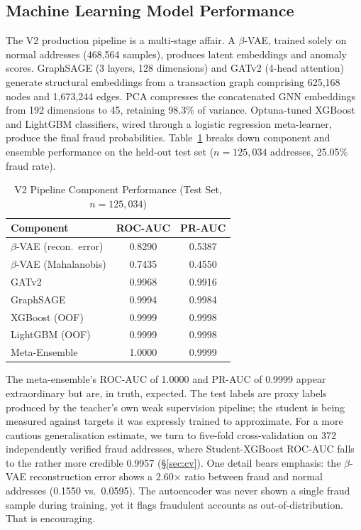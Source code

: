 \documentclass[journal]{IEEEtran}
\begin{document}
\subsection{Machine Learning Model Performance}

The V2 production pipeline is a multi-stage affair. A $\beta$-VAE, trained solely on normal addresses (468,564 samples), produces latent embeddings and anomaly scores. GraphSAGE (3 layers, 128 dimensions) and GATv2 (4-head attention) generate structural embeddings from a transaction graph comprising 625,168 nodes and 1,673,244 edges. PCA compresses the concatenated GNN embeddings from 192 dimensions to 45, retaining 98.3\% of variance. Optuna-tuned XGBoost and LightGBM classifiers, wired through a logistic regression meta-learner, produce the final fraud probabilities. Table~\ref{tab:v2performance} breaks down component and ensemble performance on the held-out test set ($n = 125{,}034$ addresses, 25.05\% fraud rate).

\begin{table}[!t]
\centering
\caption{V2 Pipeline Component Performance (Test Set, $n = 125{,}034$)}
\label{tab:v2performance}
\begin{tabular}{lcc}
\toprule
\textbf{Component} & \textbf{ROC-AUC} & \textbf{PR-AUC} \\
\midrule
$\beta$-VAE (recon.\ error) & 0.8290 & 0.5387 \\
$\beta$-VAE (Mahalanobis)   & 0.7435 & 0.4550 \\
GATv2                       & 0.9968 & 0.9916 \\
GraphSAGE                   & 0.9994 & 0.9984 \\
XGBoost (OOF)               & 0.9999 & 0.9998 \\
LightGBM (OOF)              & 0.9999 & 0.9998 \\
Meta-Ensemble               & 1.0000 & 0.9999 \\
\bottomrule
\end{tabular}
\end{table}

The meta-ensemble's ROC-AUC of 1.0000 and PR-AUC of 0.9999 appear extraordinary but are, in truth, expected. The test labels are proxy labels produced by the teacher's own weak supervision pipeline; the student is being measured against targets it was expressly trained to approximate. For a more cautious generalisation estimate, we turn to five-fold cross-validation on 372 independently verified fraud addresses, where Student-XGBoost ROC-AUC falls to the rather more credible 0.9957 (\S\ref{sec:cv}). One detail bears emphasis: the $\beta$-VAE reconstruction error shows a 2.60$\times$ ratio between fraud and normal addresses (0.1550 vs.\ 0.0595). The autoencoder was never shown a single fraud sample during training, yet it flags fraudulent accounts as out-of-distribution. That is encouraging.
\end{document}
